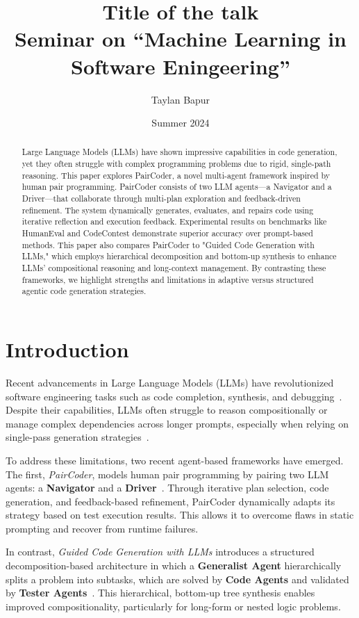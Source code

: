 \documentclass[11pt,a4paper]{article}
\title{Title of the talk \\[0.5em] \large{Seminar on ``Machine Learning in Software Eningeering'' \\[0.5em]} }
\author{Taylan Bapur}
\date{Summer 2024}
\begin{document}
\maketitle

\begin{abstract}
Large Language Models (LLMs) have shown impressive capabilities in code generation, yet they often struggle with complex programming problems due to rigid, single-path reasoning. This paper explores PairCoder, a novel multi-agent framework inspired by human pair programming. PairCoder consists of two LLM agents—a Navigator and a Driver—that collaborate through multi-plan exploration and feedback-driven refinement. The system dynamically generates, evaluates, and repairs code using iterative reflection and execution feedback. Experimental results on benchmarks like HumanEval and CodeContest demonstrate superior accuracy over prompt-based methods. This paper also compares PairCoder to "Guided Code Generation with LLMs," which employs hierarchical decomposition and bottom-up synthesis to enhance LLMs’ compositional reasoning and long-context management. By contrasting these frameworks, we highlight strengths and limitations in adaptive versus structured agentic code generation strategies.
\end{abstract}

\newpage
\tableofcontents
\newpage

\section{Introduction}
Recent advancements in Large Language Models (LLMs) have revolutionized software engineering tasks such as code completion, synthesis, and debugging~\cite{zhang2024paircoder}. Despite their capabilities, LLMs often struggle to reason compositionally or manage complex dependencies across longer prompts, especially when relying on single-pass generation strategies~\cite{chen2024selfdebugging}.

To address these limitations, two recent agent-based frameworks have emerged. The first, \textit{PairCoder}, models human pair programming by pairing two LLM agents: a \textbf{Navigator} and a \textbf{Driver}~\cite{zhang2024paircoder}. Through iterative plan selection, code generation, and feedback-based refinement, PairCoder dynamically adapts its strategy based on test execution results. This allows it to overcome flaws in static prompting and recover from runtime failures.

In contrast, \textit{Guided Code Generation with LLMs} introduces a structured decomposition-based architecture in which a \textbf{Generalist Agent} hierarchically splits a problem into subtasks, which are solved by \textbf{Code Agents} and validated by \textbf{Tester Agents}~\cite{almorsi2025guided}. This hierarchical, bottom-up tree synthesis enables improved compositionality, particularly for long-form or nested logic problems.
\end{document}
